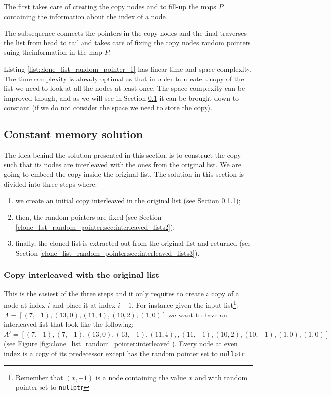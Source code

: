 

The first  takes care of creating the copy nodes and to fill-up the maps $P$ containing the information about the index of a node.

The subsequence  connects the  pointers in the copy nodes and the final  traverses the list from head to tail and takes care of fixing the copy nodes random pointers suing theinformation in the map $P$.

Listing \ref{list:clone_list_random_pointer_1}  has linear time and space  complexity. 
The time complexity is already optimal as that in order to create a copy of the list we need to look at all the nodes at least once.
The space complexity can be improved though, and as we will see in Section \ref{clone_list_random_pointer:sec:interleaved_lists} it can be brought down to constant (if we do not consider the space we need to store the copy).

\subsection{Constant memory solution}
\label{clone_list_random_pointer:sec:interleaved_lists}
The idea behind the solution presented in this section is to construct the copy such that its nodes are interleaved with the ones from the original list. We are going to embeed the copy inside the original list.
The solution in this section is divided into three steps where:
\begin{enumerate}
	\item we create an initial copy interleaved in the original list (see Section \ref{clone_list_random_pointer:sec:interleaved_lists1});
	\item then, the random pointers are fixed (see Section  \ref{clone_list_random_pointer:sec:interleaved_lists2});
	\item finally, the cloned list is extracted-out from the original list and returned (see Section  \ref{clone_list_random_pointer:sec:interleaved_lists3}).
\end{enumerate}

\subsubsection{Copy interleaved with the original list}
\label{clone_list_random_pointer:sec:interleaved_lists1}
This is the easiest of the three steps and it only requires to create a copy of a node at index $i$ and place it at index $i+1$. 
For instance given the input list\footnote{Remember that $(x,-1)$ is a node containing the value $x$ and with random pointer set to \lstinline[columns=fixed]{nullptr}}: $A = [(7,-1),(13,0),(11,4),(10,2),(1,0)]$ we want to have an interleaved list that look like the following: $A' = [(7,-1),(7,-1),(13,0),(13,-1),(11,4),,(11,-1),(10,2),(10,-1),(1,0),(1,0)]$ (see Figure \ref{fig:clone_list_random_pointer:interleaved}).
Every node at even index is a copy of its predecessor except has the random pointer set to \lstinline[columns=fixed]{nullptr}.

